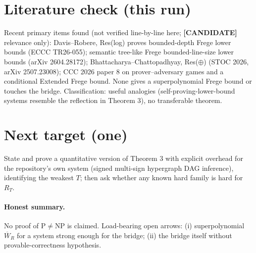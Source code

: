\documentclass[11pt]{article}
\theoremstyle{remark}\newtheorem*{remark}{Remark}
\newcommand{\status}[1]{\textbf{[#1]}}
\begin{document}
\section{Literature check (this run)}
Recent primary items found (not verified line-by-line here; \status{CANDIDATE} relevance only): Davis--Robere, Res(log) proves bounded-depth Frege lower bounds (ECCC TR26-055);
semantic tree-like Frege bounded-line-size lower bounds (arXiv 2604.28172); Bhattacharya--Chattopadhyay, Res($\oplus$) (STOC 2026, arXiv 2507.23008);
CCC 2026 paper 8 on prover--adversary games and a conditional Extended Frege bound. None gives a superpolynomial Frege bound or touches the bridge.
Classification: useful analogies (self-proving-lower-bound systems resemble the reflection in Theorem 3), no transferable theorem.

\section{Next target (one)}
State and prove a quantitative version of Theorem 3 with explicit overhead for the repository's own system (signed multi-sign hypergraph DAG inference), identifying the weakest $T$; then ask whether any known hard family is hard for $R_T$.

\paragraph{Honest summary.} No proof of $\mathrm{P}\ne\mathrm{NP}$ is claimed. Load-bearing open arrows: (i) superpolynomial $\overline W_R$ for a system strong enough for the bridge; (ii) the bridge itself without provable-correctness hypothesis.
\end{document}
